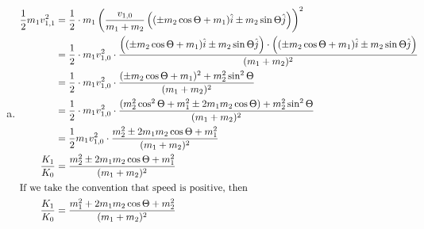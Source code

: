 \documentclass[solutions]{esg8012pset}
\begin{document}
\begin{enumerate}[a)]
    \item \begin{align*}
    \frac{1}{2}m_1 v_{1, 1}^2 & = \frac{1}{2}\cdot m_1 \left(\frac{v_{1,0}}{m_1 + m_2}\left((\pm m_2\cos\Theta + m_1)\hat i \pm m_2\sin\Theta \hat j\right)\right)^2 \\
    & = \frac{1}{2}\cdot m_1 v_{1,0}^2 \cdot \frac{\left((\pm m_2\cos\Theta + m_1)\hat i \pm m_2\sin\Theta \hat j\right)\cdot\left((\pm m_2\cos\Theta + m_1)\hat i \pm m_2\sin\Theta \hat j\right)}{(m_1 + m_2)^2} \\
    & = \frac{1}{2}\cdot m_1 v_{1,0}^2\cdot \frac{(\pm m_2\cos\Theta + m_1)^2 + m_2^2\sin^2\Theta }{(m_1 + m_2)^2} \\
    & = \frac{1}{2}\cdot m_1 v_{1,0}^2\cdot \frac{(m_2^2\cos^2\Theta + m_1^2 \pm 2 m_1 m_2\cos\Theta) + m_2^2\sin^2\Theta }{(m_1 + m_2)^2} \\
    & = \frac{1}{2} m_1 v_{1,0}^2\cdot \frac{m_2^2 \pm 2 m_1 m_2\cos\Theta + m_1^2}{(m_1 + m_2)^2} \\
    \frac{K_1}{K_0} & = \frac{m_2^2 \pm 2 m_1 m_2\cos\Theta + m_1^2}{(m_1 + m_2)^2} \\
    \intertext{If we take the convention that speed is positive, then}
    \frac{K_1}{K_0} & = \frac{m_1^2 + 2 m_1 m_2\cos\Theta + m_2^2}{(m_1 + m_2)^2}
    \end{align*}
  \end{enumerate}
\end{document}

